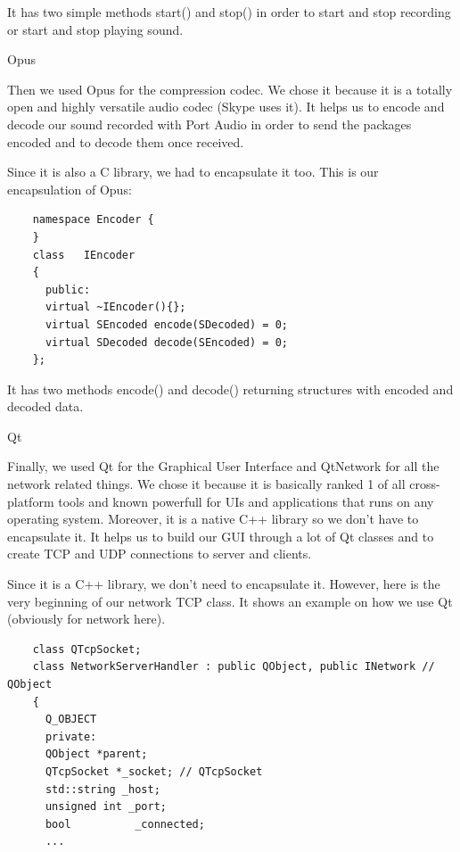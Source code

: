 \documentclass{article}
\begin{document}
  \bigskip

  It has two simple methods start() and stop() in order to start and stop recording or start and stop playing sound.

  \newpage

  \bigskip
  Opus
  \bigskip

  Then we used Opus for the compression codec. We chose it because it is a totally open and highly versatile audio codec (Skype uses it). It helps us to encode and decode our sound recorded with Port Audio in order to send the packages encoded and to decode them once received.

  \bigskip
  Since it is also a C library, we had to encapsulate it too. This is our encapsulation of Opus:
  \bigskip

  \begin{lstlisting}
    namespace Encoder {
    }
    class   IEncoder
    {
      public:
      virtual ~IEncoder(){};
      virtual SEncoded encode(SDecoded) = 0;
      virtual SDecoded decode(SEncoded) = 0;
    };
  \end{lstlisting}

  \bigskip

  It has two methods encode() and decode() returning structures with encoded and decoded data.

  \newpage

  \bigskip
  Qt
  \bigskip

  Finally, we used Qt for the Graphical User Interface and QtNetwork for all the network related things. We chose it because it is basically ranked 1 of all cross-platform tools and known powerfull for UIs and applications that runs on any operating system. Moreover, it is a native C++ library so we don't have to encapsulate it. It helps us to build our GUI through a lot of Qt classes and to create TCP and UDP connections to server and clients.

  \bigskip
  Since it is a C++ library, we don't need to encapsulate it. However, here is the very beginning of our network TCP class. It shows an example on how we use Qt (obviously for network here).
  \bigskip

  \begin{lstlisting}
    class QTcpSocket;
    class NetworkServerHandler : public QObject, public INetwork // QObject
    {
      Q_OBJECT
      private:
      QObject *parent;
      QTcpSocket *_socket; // QTcpSocket
      std::string _host;
      unsigned int _port;
      bool          _connected;
      ...
  \end{lstlisting}
\end{document}
